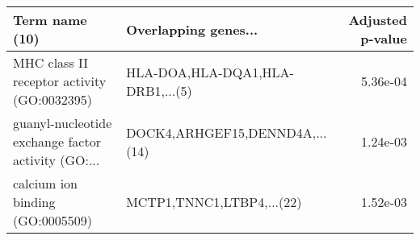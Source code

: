 \begin{tabular}{llr}
\toprule
                                    Term name (10) &             Overlapping genes... &  Adjusted p-value \\
\midrule
       MHC class II receptor activity (GO:0032395) & HLA-DOA,HLA-DQA1,HLA-DRB1,...(5) &          5.36e-04 \\
guanyl-nucleotide exchange factor activity (GO:... &   DOCK4,ARHGEF15,DENND4A,...(14) &          1.24e-03 \\
                  calcium ion binding (GO:0005509) &        MCTP1,TNNC1,LTBP4,...(22) &          1.52e-03 \\
\bottomrule
\end{tabular}
